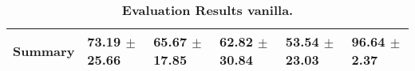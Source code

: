\begin{table}[htb]
{\begin{tabular}{llllll}
\midrule
\textbf{Summary                                  } &                  \phantom{0}73.19 $\pm$ 25.66 &                      \phantom{0}65.67 $\pm$ 17.85 &                  \phantom{0}62.82 $\pm$ 30.84 &            \phantom{0}53.54 $\pm$ 23.03 &  \phantom{0}96.64 $\pm$ \phantom{0}2.37 \\
\bottomrule
\end{tabular}%
}
\caption{\textbf{Evaluation Results vanilla.}}
\label{tab:eval-results}
\end{table}


